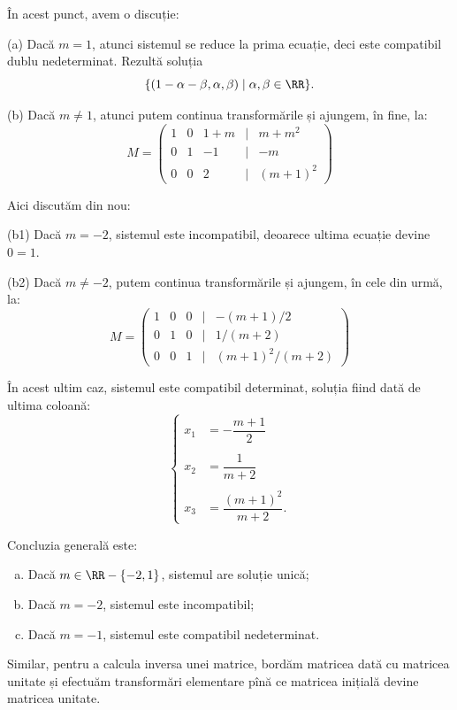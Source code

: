 În acest punct, avem o discuție:

(a) Dacă $m = 1$, atunci sistemul se reduce la prima ecuație, deci este compatibil
dublu nedeterminat. Rezultă soluția
\[
  \{ (1 - \alpha - \beta, \alpha, \beta) \mid \alpha, \beta \in \RR \}.
\]

(b) Dacă $m \neq 1$, atunci putem continua transformările și ajungem, în fine, la:
\[
  M = \begin{pmatrix}
    1 & 0 & 1 + m & \mid & m + m^2 \\
    0 & 1 & -1 & \mid & -m \\
    0 & 0 & 2 & \mid & (m + 1)^2
  \end{pmatrix}
\]

Aici discutăm din nou:

(b1) Dacă $m = -2$, sistemul este incompatibil, deoarece ultima ecuație devine $0 = 1$.

(b2) Dacă $m \neq -2$, putem continua transformările și ajungem, în cele din urmă, la:
\[
  M = %
  \begin{pmatrix}
    1 & 0 & 0 & \mid & -(m+1)/2 \\
    0 & 1 & 0 & \mid & 1/(m+2) \\
    0 & 0 & 1 & \mid & (m+1)^2/(m+2)
  \end{pmatrix}
\]


În acest ultim caz, sistemul este compatibil determinat, soluția fiind dată de ultima coloană:
\[
  \begin{cases}
    x_1  &= -\dfrac{m + 1}{2} \\
    & \\
    x_2  &= \dfrac{1}{m + 2} \\
    & \\
    x_3  &= \dfrac{(m + 1)^2}{m + 2}.
  \end{cases}
\]

Concluzia generală este:
\begin{enumerate}[(a)]
\item Dacă $m \in \RR - \{-2, 1\}$, sistemul are soluție unică;
\item Dacă $m = -2$, sistemul este incompatibil;
\item Dacă $m = -1$, sistemul este compatibil nedeterminat.
\end{enumerate}

\vspace{1cm}

Similar, pentru a calcula inversa unei matrice, bordăm matricea dată cu matricea
unitate și efectuăm transformări elementare pînă ce matricea inițială devine
matricea unitate.

